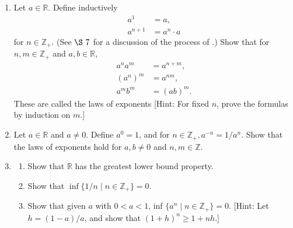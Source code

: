 \begin{enumerate}[itemsep=0.4em, parsep=0pt, topsep=0pt, partopsep=0pt, leftmargin=*, label=\arabic*., ref=\arabic*]
\begin{enumerate}[itemsep=0.2em, parsep=0pt, topsep=0pt, partopsep=0pt, leftmargin=*, label=(\alph*), align=left]
  \item \(a,b \in {\mathbb{Z}}_{+} \Rightarrow a + b \in {\mathbb{Z}}_{+}\). [Hint: Show that given \(a \in {\mathbb{Z}}_{+}\), the set \(X = \{ {x \mid x \in \mathbb{R}\text{ and }a + x \in {\mathbb{Z}}_{+}}\}\) is inductive.]
  \item \(a,b \in {\mathbb{Z}}_{+} \Rightarrow a \cdot b \in {\mathbb{Z}}_{+}\).
  \item Show that \(a \in {\mathbb{Z}}_{+} \Rightarrow a - 1 \in {\mathbb{Z}}_{+} \cup \{ 0\}\). [Hint: Let \(X = \{ x \mid x \in \mathbb{R}\) and \(x - 1 \in {\mathbb{Z}}_{+} \cup \{ 0\}\) ; show that \(X\) is inductive.]
  \item \(c,d \in \mathbb{Z} \Rightarrow c + d \in \mathbb{Z}\) and \(c - d \in \mathbb{Z}\). [Hint. Prove it first for \(d = 1\).]
  \item \(c,d \in \mathbb{Z} \Rightarrow c \cdot d \in \mathbb{Z}\).
  \end{enumerate}
\item Let \(a \in \mathbb{R}\). Define inductively \[ \begin{aligned} a^{1} &= a, \\ a^{n + 1} &= a^{n} \cdot a \end{aligned} \] for \(n \in {\mathbb{Z}}_{+}\). (See \(\S\ 7\) for a discussion of the process of .) Show that for \(n,m \in {\mathbb{Z}}_{+}\) and \(a,b \in \mathbb{R}\), \[ \begin{aligned} a^{n}a^{m} &= a^{n + m}, \\ {(a^{n}) }^{m} &= a^{nm}, \\ a^{m}b^{m} &= {( ab) }^{m}. \end{aligned} \] These are called the laws of exponents [Hint: For fixed \(n\), prove the formulas by induction on \(m\).]
\item Let \(a \in \mathbb{R}\) and \(a \neq 0\). Define \(a^{0} = 1\), and for \(n \in {\mathbb{Z}}_{+},a^{-n} = 1/a^{n}\). Show that the laws of exponents hold for \(a,b \neq 0\) and \(n,m \in \mathbb{Z}\).
\item
  \begin{enumerate}[itemsep=0.2em, parsep=0pt, topsep=0pt, partopsep=0pt, leftmargin=*, label=(\alph*), align=left]
  \item Show that \(\mathbb{R}\) has the greatest lower bound property.
  \item Show that \(\inf \{ {1/n \mid n \in {\mathbb{Z}}_{+}}\} = 0\).
  \item Show that given \(a\) with \(0 < a < 1\), inf \(\{ {a^{n} \mid n \in {\mathbb{Z}}_{+}}\} = 0\). [Hint: Let \(h = ({1 - a}) /a\), and show that \({( 1 + h) }^{n} \geq 1 + {nh}\).]

\end{enumerate}
\end{enumerate}
